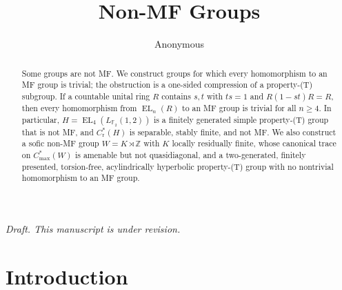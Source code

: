 \documentclass[11pt]{amsart}
\newcommand{\paperauthor}{Anonymous}
\newcommand{\paperauthor}{\paperauthorname}
\newcommand{\leanverified}[2]{\ignorespaces}
\theoremstyle{plain}
\newcommand{\F}{\mathbb F}
\newcommand{\EL}{\operatorname{EL}}
\newcommand{\draftnotice}{%
  \begin{center}
    \small\itshape Draft. This manuscript is under revision.
  \end{center}}
\begin{document}
\frenchspacing
\title{Non-MF Groups}
\author{\paperauthor}

\begin{abstract}
\addtolength{\leftskip}{1.5pc}\addtolength{\rightskip}{1.5pc}
\leanverified{Manuscript/OneSidedMFRadical/CountableNonMF}{GroupApproximation.Manuscript.OneSidedMFRadical.manuscriptNotEveryCountableGroupIsMF}
Some groups are not MF.  We construct groups for which every homomorphism
to an MF group is trivial; the obstruction is a one-sided compression of
a property-\textup{(T)} subgroup.  If a countable unital ring $R$
contains $s,t$ with $ts=1$ and $R(1-st)R=R$, then every homomorphism
from $\EL_n(R)$ to an MF group is trivial for all $n\ge4$.  In
particular, $H=\EL_4(L_{\F_2}(1,2))$ is a finitely generated simple
property-\textup{(T)} group that is not MF, and $C^*_{\mathrm r}(H)$ is
separable, stably finite, and not MF.  We also construct a sofic non-MF
group $W=K\rtimes\mathbb Z$ with $K$ locally residually finite, whose
canonical trace on $C^*_{\max}(W)$ is amenable but not quasidiagonal,
and a two-generated, finitely presented, torsion-free, acylindrically
hyperbolic property-\textup{(T)} group with no nontrivial homomorphism
to an MF group.
\end{abstract}

\maketitle
\draftnotice

\section{Introduction}
\end{document}
